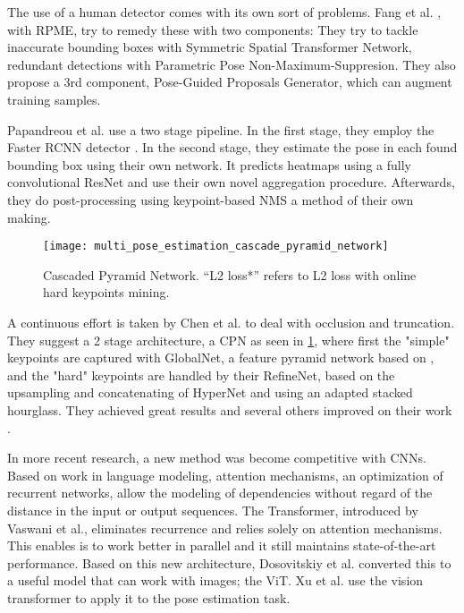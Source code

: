 The use of a human detector comes with its own sort of problems.
Fang et al. \cite{Fang2016}, with \gls{RPME}, try to remedy these with two components:
They try to tackle inaccurate bounding boxes with Symmetric Spatial Transformer Network, redundant detections with Parametric Pose Non-Maximum-Suppresion.
They also propose a 3rd component, Pose-Guided Proposals Generator, which can augment training samples.

Papandreou et al. \cite{Papandreou2017} use a two stage pipeline.
In the first stage, they employ the Faster RCNN detector \cite{Ren2015}.
In the second stage, they estimate the pose in each found bounding box using their own network.
It predicts heatmaps using a fully convolutional \gls{ResNet} and use their own novel aggregation procedure.
Afterwards, they do post-processing using keypoint-based \gls{NMS} a method of their own making.

\begin{figure}
	\centering
	\texttt{[image: multi\_pose\_estimation\_cascade\_pyramid\_network]}%
	\caption{
		Cascaded Pyramid Network. “L2 loss*” refers to L2 loss with online hard keypoints mining.\cite{Chen2017}
	}
	\label{fig:cascade_pyramid_network}
\end{figure}

A continuous effort is taken by Chen et al. \cite{Chen2017} to deal with occlusion and truncation.
They suggest a 2 stage architecture, a \gls{CPN} as seen in \ref{fig:cascade_pyramid_network},
where first the "simple" keypoints are captured with GlobalNet, a feature pyramid network based on \cite{Lin2016},
and the "hard" keypoints are handled by their RefineNet, based on the upsampling and concatenating of HyperNet \cite{Kong2016} and using an adapted stacked hourglass.
They achieved great results and several others improved on their work \cite{Su2019, Li2019}.

In more recent research, a new method was become competitive with \glspl{CNN}.
Based on work in language modeling, attention mechanisms, an optimization of recurrent networks, allow the modeling of dependencies without regard of the distance in the input or output sequences.
The Transformer, introduced by Vaswani et al., \cite{Vaswani2017} eliminates recurrence and relies solely on attention mechanisms.
This enables is to work better in parallel and it still maintains state-of-the-art performance.
Based on this new architecture, Dosovitskiy et al. \cite{Dosovitskiy2020} converted this to a useful model that can work with images; the \gls{ViT}.
Xu et al. \cite{xu2022} use the vision transformer to apply it to the pose estimation task.

